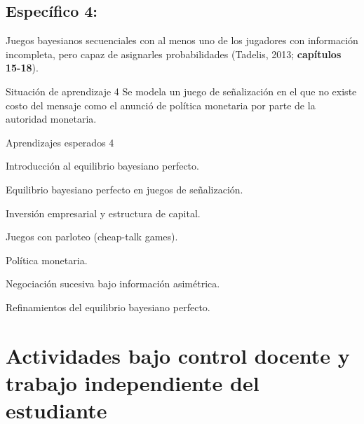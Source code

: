 \documentclass[11pt]{article}
\newenvironment{tight_enumerate}{
	\begin{enumerate}
		\setlength{\itemsep}{0pt}
		\setlength{\parskip}{0pt}
	}{\end{enumerate}}
\begin{document}
\begin{tcolorbox}[colback=bluerow!60]
	\subsection{Específico 4: }
	Juegos bayesianos secuenciales con al menos uno de los jugadores con información incompleta, pero capaz de asignarles probabilidades (Tadelis, 2013; \textbf{capítulos 15-18}).
	\begin{mybox}[colback=redrow!80]{Situación de aprendizaje 4}
		Se modela un juego de señalización en el que no existe costo del mensaje como el anunció de política monetaria por parte de la autoridad monetaria.
	\end{mybox}
	
	\begin{mybox}[colback=purplerow!80]{Aprendizajes esperados 4}
		\begin{tight_enumerate}
			\item Introducción al equilibrio bayesiano perfecto.
			\item Equilibrio bayesiano perfecto en juegos de señalización.
			\item Inversión empresarial y estructura de capital.
			\item Juegos con parloteo (cheap-talk games).
			\item Política monetaria.
			\item Negociación sucesiva bajo información asimétrica.
			\item Refinamientos del equilibrio bayesiano perfecto.
		\end{tight_enumerate}
	\end{mybox}
\end{tcolorbox}

\section{Actividades bajo control docente y trabajo independiente del estudiante}
\end{document}
